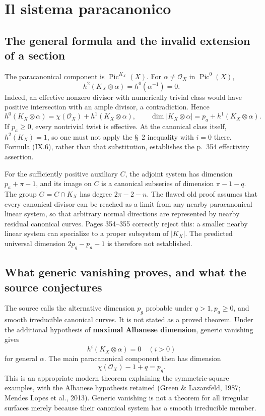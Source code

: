 \section{Il sistema paracanonico}\label{cp2-ix-8}

\subsection{The general formula and the invalid extension of a section}\label{cp2-ix-8-1}

The paracanonical component is \(\operatorname{Pic}^{K_X}(X)\). For \(\alpha\ne\mathcal O_X\) in \(\operatorname{Pic}^0(X)\),
\[
h^2(K_X\otimes\alpha)=h^0(\alpha^{-1})=0.
\]
Indeed, an effective nonzero divisor with numerically trivial class would have positive intersection with an ample divisor, a contradiction. Hence
\begin{equation*}\label{cp2-ix-eq6}
h^0(K_X\otimes\alpha)=\chi(\mathcal O_X)+h^1(K_X\otimes\alpha),\qquad
\dim\vert K_X\otimes\alpha\vert =p_a+h^1(K_X\otimes\alpha).
\tag{IX.6}
\end{equation*}
If \(p_a\geq0\), every nontrivial twist is effective. At the canonical class itself, \(h^2(K_X)=1\), so one must not apply the \S~2 inequality with \(i=0\) there. Formula (IX.6), rather than that substitution, establishes the p.~354 effectivity assertion.

For the sufficiently positive auxiliary \(C\), the adjoint system has dimension \(p_a+\pi-1\), and its image on \(C\) is a canonical subseries of dimension \(\pi-1-q\). The group \(G=C\cap K_X\) has degree \(2\pi-2-n\). The flawed old proof assumes that every canonical divisor can be reached as a limit from any nearby paracanonical linear system, so that arbitrary normal directions are represented by nearby residual canonical curves. Pages 354--355 correctly reject this: a smaller nearby linear system can specialize to a proper subsystem of \(\vert K_X\vert \). The predicted universal dimension \(2p_g-p_a-1\) is therefore not established.

\subsection{What generic vanishing proves, and what the source conjectures}\label{cp2-ix-8-2}

The source calls the alternative dimension \(p_g\) probable under \(q>1,p_a\geq0\), and smooth irreducible canonical curves. It is not stated as a proved theorem. Under the additional hypothesis of \textbf{maximal Albanese dimension}, generic vanishing gives
\[
h^i(K_X\otimes\alpha)=0\quad(i>0)
\]
for general \(\alpha\). The main paracanonical component then has dimension
\[
\chi(\mathcal O_X)-1+q=p_g.
\]
This is an appropriate modern theorem explaining the symmetric-square examples, with the Albanese hypothesis retained (Green \& Lazarsfeld, 1987; Mendes Lopes et al., 2013). Generic vanishing is not a theorem for all irregular surfaces merely because their canonical system has a smooth irreducible member.

